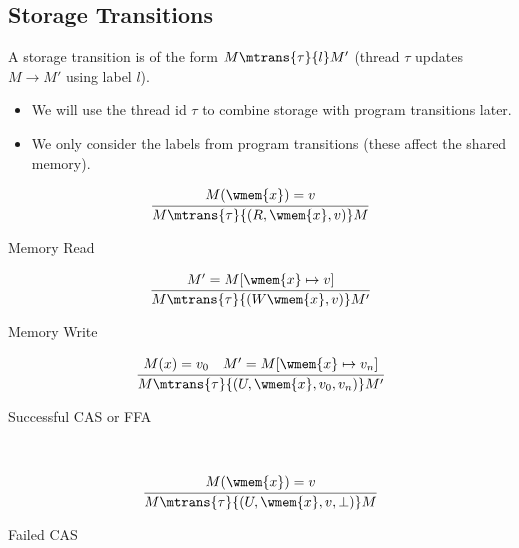 \subsection{Storage Transitions}
A storage transition is of the form $M \mtrans{\tau}{l} M'$ (thread $\tau$ updates $M \to M'$ using label $l$).
\begin{itemize}
    \item We will use the thread id $\tau$ to combine storage with program transitions later.
    \item We only consider the labels from program transitions (these affect the shared memory).
\end{itemize}
\begin{minipage}{.33\textwidth}
    \[\cfrac{
        M(\wmem{x}) = v
    }{
        M \mtrans{\tau}{(R, \wmem{x}, v)} M
    }\]
    \centerline{Memory Read}
\end{minipage}
\begin{minipage}{.33\textwidth}
    \[\cfrac{
        M' = M[\wmem{x} \mapsto v]
    }{
        M \mtrans{\tau}{(W \wmem{x}, v)} M'
    }\]
    \centerline{Memory Write}
\end{minipage}
\begin{minipage}{.33\textwidth}
    \[\cfrac{
        M(x) = v_0 \quad M' = M[\wmem{x} \mapsto v_n]
    }{
        M \mtrans{\tau}{(U, \wmem{x}, v_0, v_n)} M'
    }\]
    \centerline{Successful CAS or FFA}
\end{minipage}
\vspace{5mm}
\\ \begin{minipage}{.33\textwidth}
    \[\cfrac{
        M(\wmem{x}) = v
    }{
        M \mtrans{\tau}{(U, \wmem{x}, v, \bot)} M
    }\]
    \centerline{Failed CAS}
\end{minipage}

